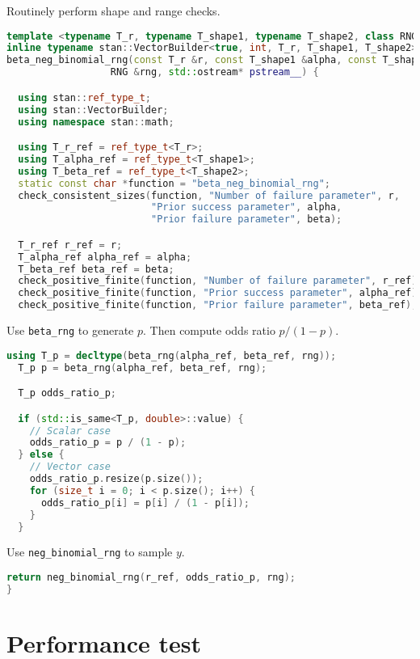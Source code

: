 \documentclass[11pt]{article}
\begin{document}
Routinely perform shape and range checks.
\begin{lstlisting}[language=c++, style=lgeneral]
template <typename T_r, typename T_shape1, typename T_shape2, class RNG>
inline typename stan::VectorBuilder<true, int, T_r, T_shape1, T_shape2>::type
beta_neg_binomial_rng(const T_r &r, const T_shape1 &alpha, const T_shape2 &beta,
                  RNG &rng, std::ostream* pstream__) {

  using stan::ref_type_t;
  using stan::VectorBuilder;
  using namespace stan::math;

  using T_r_ref = ref_type_t<T_r>;
  using T_alpha_ref = ref_type_t<T_shape1>;
  using T_beta_ref = ref_type_t<T_shape2>;
  static const char *function = "beta_neg_binomial_rng";
  check_consistent_sizes(function, "Number of failure parameter", r,
                         "Prior success parameter", alpha,
                         "Prior failure parameter", beta);

  T_r_ref r_ref = r;
  T_alpha_ref alpha_ref = alpha;
  T_beta_ref beta_ref = beta;
  check_positive_finite(function, "Number of failure parameter", r_ref);
  check_positive_finite(function, "Prior success parameter", alpha_ref);
  check_positive_finite(function, "Prior failure parameter", beta_ref);

\end{lstlisting}


Use \verb|beta_rng| to generate $p$. Then compute odds ratio $p/(1-p)$.
\begin{lstlisting}[language=c++, style=lgeneral]
  using T_p = decltype(beta_rng(alpha_ref, beta_ref, rng));
  T_p p = beta_rng(alpha_ref, beta_ref, rng);

  T_p odds_ratio_p;

  if (std::is_same<T_p, double>::value) {
    // Scalar case
    odds_ratio_p = p / (1 - p);
  } else {
    // Vector case
    odds_ratio_p.resize(p.size());
    for (size_t i = 0; i < p.size(); i++) {
      odds_ratio_p[i] = p[i] / (1 - p[i]);
    }
  }	
\end{lstlisting}

Use \verb|neg_binomial_rng| to sample $y$.
\begin{lstlisting}[language=c++, style=lgeneral]
	return neg_binomial_rng(r_ref, odds_ratio_p, rng);
}	
\end{lstlisting}








\section{Performance test}
\end{document}
